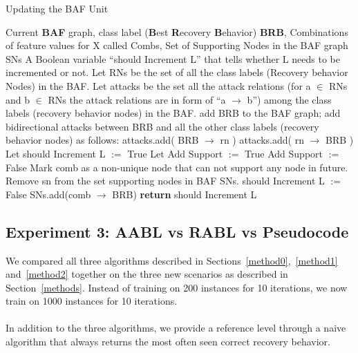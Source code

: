 \documentclass{article}
\begin{document}
\begin{algorithm}[H]
\caption{Updating the BAF Unit}
\label{alg:updateBAF}
\begin{algorithmic}[1]
\Require Current \textbf{BAF} graph, class label (\textbf{B}est \textbf{R}ecovery \textbf{B}ehavior)
\textbf{BRB}, Combinations of feature values for X called Combs, Set of Supporting Nodes in the BAF graph SNs
\Ensure A Boolean variable “should Increment L” that tells whether L needs to be incremented or not.
\State Let RNs be the set of all the class labels (Recovery behavior Nodes) in the BAF.
\State Let attacks be the set all the attack relations (for a $\in$ RNs and b $\in$ RNs the attack relations are in form of “a $\to$ b”) among the class labels (recovery behavior nodes) in the BAF.
\Statex
{}
\State add BRB to the BAF graph;
\State add bidirectional attacks between BRB and all the other class labels (recovery behavior nodes) as follows:
\State attacks.add( BRB $\to$ rn )
\State attacks.add( rn $\to$ BRB )
\EndFor
\EndIf
\Statex
{}
\State Let should Increment L $:=$ True
\State Let Add Support $:=$ True
\State Add Support $:=$ False
\State Mark comb as a non-unique node that can not support any node in future.
\State Remove sn from the set supporting nodes in BAF SNs.
\EndIf
\EndIf
\EndFor
{}
\State should Increment L $:=$ False
\EndIf
{}
\State SNs.add(comb $\to$ BRB)
\EndIf
\EndFor
\State \textbf{return} should Increment L
\EndProcedure
\end{algorithmic}
\end{algorithm}
\subsection{Experiment 3: AABL vs RABL vs Pseudocode}
We compared all three algorithms described in Sections~\ref{method0},~\ref{method1} and~\ref{method2} together on the three new scenarios as described in Section~\ref{methods}. Instead of training on 200 instances for 10 iterations, we now train on 1000 instances for 10 iterations. 
\\\\
In addition to the three algorithms, we provide a reference level through a naive algorithm that always returns the most often seen correct recovery behavior. 
\end{document}
